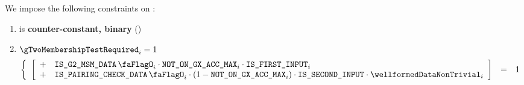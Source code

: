 \noindent
We impose the following constraints on \gTwoMembershipTestRequired{}:
\begin{enumerate}
    \item \gTwoMembershipTestRequired{} is \textbf{counter-constant, binary} \quad (\trash)
    \item \If $\gTwoMembershipTestRequired_{i} = 1$ \Then
        \[
            \left\{ \begin{array}{lcl}
                \left[ \begin{array}{cl}
                    + & \isBlsGTwoMsmData_{i} \cdot \notOnGXAccMax_{i} \cdot \isFirstInput_{i}  \\
                    + & \isBlsPairingCheckData_{i} \cdot (1 - \notOnGXAccMax_{i}) \cdot \isSecondInput \cdot \wellformedDataNonTrivial_{i} \\
                \end{array} \right] & = & 1 \\
            \end{array} \right.
        \]
\end{enumerate}


